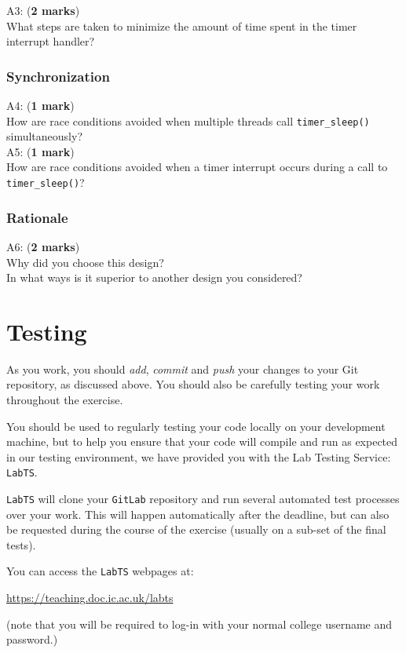 \documentclass[a4paper,12pt]{article}
\newcommand{\shell}[1]{\lstinline!#1!}
\begin{document}
\noindent A3: ({\bf 2 marks}) \\
What steps are taken to minimize the amount of time spent in the timer interrupt handler?

\subsubsection*{Synchronization}
A4: ({\bf 1 mark}) \\
How are race conditions avoided when multiple threads call \shell{timer_sleep()} simultaneously? \\ 

\noindent A5: ({\bf 1 mark}) \\
How are race conditions avoided when a timer interrupt occurs during a call to \shell{timer_sleep()}?

\subsubsection*{Rationale}
A6: ({\bf 2 marks}) \\
Why did you choose this design? \\
In what ways is it superior to another design you considered?

\section*{Testing}
As you work, you should \emph{add}, \emph{commit} and \emph{push} your changes to your Git repository, as discussed above.
You should also be carefully testing your work throughout the exercise. 

You should be used to regularly testing your code locally on your development machine, 
but to help you ensure that your code will compile and run as expected in our testing environment,
we have provided you with the Lab Testing Service: \shell{LabTS}.

\shell{LabTS} will clone your \shell{GitLab} repository and run several automated test processes over your work.
This will happen automatically after the deadline, but can also be requested during the course of the exercise (usually on a sub-set of the final tests). 

You can access the \shell{LabTS} webpages at:

\url{https://teaching.doc.ic.ac.uk/labts}

\noindent (note that you will be required to log-in with your normal college username and password.)
\end{document}

